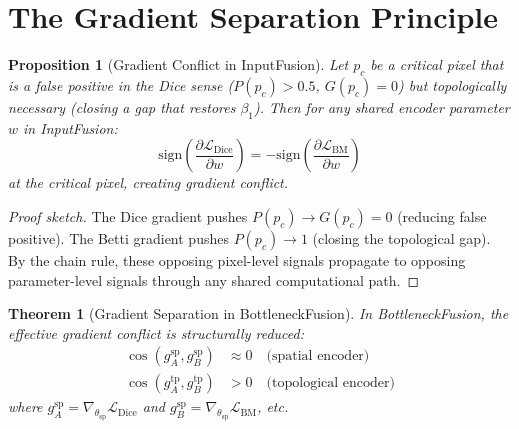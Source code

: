 \documentclass[10pt,twocolumn]{article}
\newtheorem{proposition}[definition]{Proposition}
\newtheorem{theorem}[definition]{Theorem}
\begin{document}
\section{The Gradient Separation Principle}

\begin{proposition}[Gradient Conflict in InputFusion]\label{prop:conflict}
Let $p_c$ be a \emph{critical pixel} that is a false positive in the Dice sense ($P(p_c) > 0.5$, $G(p_c) = 0$) but topologically necessary (closing a gap that restores $\beta_1$). Then for any shared encoder parameter $w$ in InputFusion:
\begin{equation}
\text{sign}\left(\frac{\partial \mathcal{L}_{\text{Dice}}}{\partial w}\right) = -\text{sign}\left(\frac{\partial \mathcal{L}_{\text{BM}}}{\partial w}\right)
\end{equation}
at the critical pixel, creating gradient conflict.
\end{proposition}

\begin{proof}[Proof sketch]
The Dice gradient pushes $P(p_c) \to G(p_c) = 0$ (reducing false positive). The Betti gradient pushes $P(p_c) \to 1$ (closing the topological gap). By the chain rule, these opposing pixel-level signals propagate to opposing parameter-level signals through any shared computational path.
\end{proof}

\begin{theorem}[Gradient Separation in BottleneckFusion]\label{thm:sep}
In BottleneckFusion, the effective gradient conflict is structurally reduced:
\begin{align}
\cos(g_A^{\text{sp}}, g_B^{\text{sp}}) &\approx 0 \quad \text{(spatial encoder)} \\
\cos(g_A^{\text{tp}}, g_B^{\text{tp}}) &> 0 \quad \text{(topological encoder)}
\end{align}
where $g_A^{\text{sp}} = \nabla_{\theta_{\text{sp}}} \mathcal{L}_{\text{Dice}}$ and $g_B^{\text{sp}} = \nabla_{\theta_{\text{sp}}} \mathcal{L}_{\text{BM}}$, etc.
\end{theorem}
\end{document}

